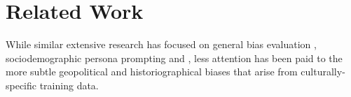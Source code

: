 \documentclass[11pt]{article}
\begin{document}

    
    
    
    
    

\section{Related Work}
While similar extensive research has focused on general bias evaluation \cite{guo2024}, sociodemographic persona prompting \cite{lutz2025} and \cite{}, less attention has been paid to the more subtle geopolitical and historiographical biases that arise from culturally-specific training data.
\end{document}
